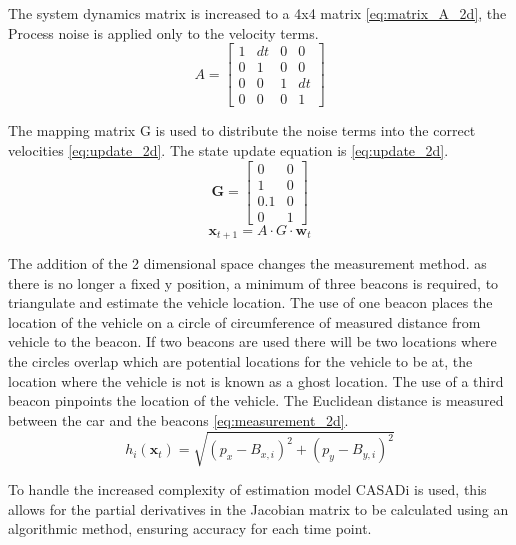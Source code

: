 \noindent The system dynamics matrix is increased to a 4x4 matrix \eqref{eq:matrix_A_2d}, the Process
noise is applied only to the velocity terms. 
\begin{equation} \label{eq:matrix_A_2d}
    A = \begin{bmatrix} 
    1 & dt & 0 & 0 \\ 
    0 & 1 & 0 & 0 \\ 
    0 & 0 & 1 & dt \\ 
    0 & 0 & 0 & 1 
    \end{bmatrix}
\end{equation}

\noindent The mapping matrix G is used to distribute
the noise terms into the correct velocities \eqref{eq:update_2d}. The state update equation is \eqref{eq:update_2d}.
\begin{equation} \label{eq:G_matrix}
    \mathbf G = \begin{bmatrix} 0 & 0 \\ 1 & 0 \\ 0.1 & 0 \\ 0 & 1 \end{bmatrix} 
\end{equation}
\begin{equation} \label{eq:update_2d}
    \mathbf{x}_{t+1} = A\cdot G\cdot  \mathbf{w}_t
\end{equation}

\noindent The addition of the 2 dimensional space changes the measurement
method. as there is no longer a fixed y position, a minimum of three beacons is
required, to triangulate and estimate the vehicle location. The use of one
beacon places the location of the vehicle on a circle of circumference of
measured distance from vehicle to the beacon. If two beacons are used there
will be two locations where the circles overlap which are potential locations for
the vehicle to be at, the location where the vehicle is not is known as a ghost
location. The use of a third beacon pinpoints the location of the vehicle. The Euclidean
distance is measured between the car and the beacons \eqref{eq:measurement_2d}. 
\begin{equation} \label{eq:measurement_2d}
    h_i(\mathbf{x}_t) = \sqrt{(p_x - B_{x,i})^2 + (p_y - B_{y,i})^2}
\end{equation}

\noindent To handle the increased complexity of estimation model
CASADi is used, this allows for the partial derivatives in the Jacobian matrix
to be calculated using an algorithmic method, ensuring accuracy for each time point.

